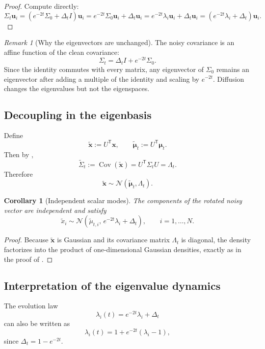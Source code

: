 \documentclass[11pt]{article}
\numberwithin{equation}{section}
\newtheorem{corollary}[theorem]{Corollary}
\theoremstyle{definition}
\theoremstyle{remark}
\newtheorem{remark}[theorem]{Remark}
\newcommand{\Cov}{\operatorname{Cov}}
\newcommand{\Id}{I}
\newcommand{\trans}{\mathsf{T}}
\newcommand{\Ncal}{\mathcal{N}}
\begin{document}
\begin{proof}
Compute directly:
\[
\Sigma_t\mathbf u_i
=
(e^{-2t}\Sigma_0+\Delta_t\Id)\mathbf u_i
=
e^{-2t}\Sigma_0\mathbf u_i+\Delta_t\mathbf u_i
=
e^{-2t}\lambda_i\mathbf u_i+\Delta_t\mathbf u_i
=
(e^{-2t}\lambda_i+\Delta_t)\mathbf u_i.
\]
\end{proof}

\begin{remark}[Why the eigenvectors are unchanged]
The noisy covariance is an affine function of the clean covariance:
\[
\Sigma_t=\Delta_t\Id+e^{-2t}\Sigma_0.
\]
Since the identity commutes with every matrix, any eigenvector of $\Sigma_0$ remains an eigenvector after adding a multiple of the identity and scaling by $e^{-2t}$. Diffusion changes the eigenvalues but not the eigenspaces.
\end{remark}

\subsection{Decoupling in the eigenbasis}

Define
\[
\widetilde{\mathbf x}:=U^\trans\mathbf x,
\qquad
\widetilde{\boldsymbol{\mu}}_t:=U^\trans\boldsymbol{\mu}_t.
\]
Then by ,
\[
\widetilde{\Sigma}_t:=\Cov(\widetilde{\mathbf x})=U^\trans\Sigma_t U=\Lambda_t.
\]
Therefore
\[
\widetilde{\mathbf x}\sim \Ncal(\widetilde{\boldsymbol{\mu}}_t,\Lambda_t).
\]

\begin{corollary}[Independent scalar modes]\label{cor:modewise}
The components of the rotated noisy vector are independent and satisfy
\[
\widetilde x_i \sim \Ncal(\widetilde\mu_{t,i},\,e^{-2t}\lambda_i+\Delta_t),
\qquad i=1,\dots,N.
\]
\end{corollary}

\begin{proof}
Because $\widetilde{\mathbf x}$ is Gaussian and its covariance matrix $\Lambda_t$ is diagonal, the density factorizes into the product of one-dimensional Gaussian densities, exactly as in the proof of .
\end{proof}

\subsection{Interpretation of the eigenvalue dynamics}

The evolution law
\[
\lambda_i(t)=e^{-2t}\lambda_i+\Delta_t
\]
can also be written as
\begin{equation}\label{eq:lambda_t_centered}
\lambda_i(t)=1+e^{-2t}(\lambda_i-1),
\end{equation}
since $\Delta_t=1-e^{-2t}$.
\end{document}
